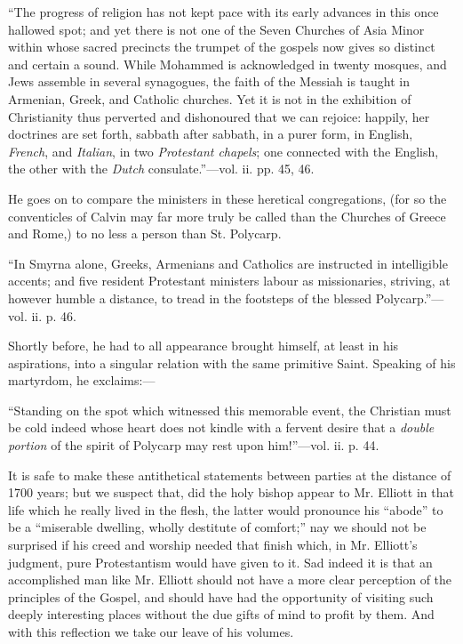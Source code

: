 ``The
progress of religion has not kept pace with its early advances in this
once hallowed spot; and yet there is not one of the Seven Churches of
Asia Minor within whose sacred precincts the trumpet of the gospels now
gives so distinct and certain a sound. While Mohammed is acknowledged in
twenty mosques, and Jews assemble in several synagogues, the faith of
the Messiah is taught in Armenian, Greek, and Catholic churches. Yet it
is not in the exhibition of Christianity thus perverted and dishonoured
that we can rejoice: happily, her doctrines are set forth, sabbath after
sabbath, in a purer form, in English, \emph{French}, and \emph{Italian},
in two \emph{Protestant chapels}; one connected with the English, the
other with the \emph{Dutch} consulate.''—vol. ii. pp. 45, 46.

He goes on
to compare the ministers in these heretical congregations, (for so the
conventicles of Calvin may far more truly be called than the Churches of
Greece and Rome,) to no less a person than St. Polycarp.

``In
Smyrna alone, Greeks, Armenians and Catholics are instructed in
intelligible accents; and five resident Protestant ministers labour as
missionaries, striving, at however humble a distance, to tread in the
footsteps of the blessed Polycarp.''—vol. ii. p. 46.

Shortly
before, he had to all appearance brought himself, at least in his
aspirations, into a singular relation with the same primitive Saint.
Speaking of his martyrdom, he exclaims:—

``Standing
on the spot which witnessed this memorable event, the Christian must be
cold indeed whose heart does not kindle with a fervent desire that a \emph{double
portion} of the spirit of Polycarp may rest upon him!''—vol. ii. p.
44.

It is safe
to make these antithetical statements between parties at the distance of
1700 years; but we suspect that, did the holy bishop appear to Mr.
Elliott in that life which he really lived in the flesh, the latter
would pronounce his ``abode'' to be a ``miserable dwelling, wholly
destitute of comfort;'' nay we should not be surprised if his creed and
worship needed that finish which, in Mr. Elliott's judgment, pure
Protestantism would have given to it. Sad indeed it is that an
accomplished man like Mr. Elliott should not have a more clear
perception of the principles of the Gospel, and should have had the
opportunity of visiting such deeply interesting places without the due
gifts of mind to profit by them. And with this reflection we take our
leave of his volumes.


